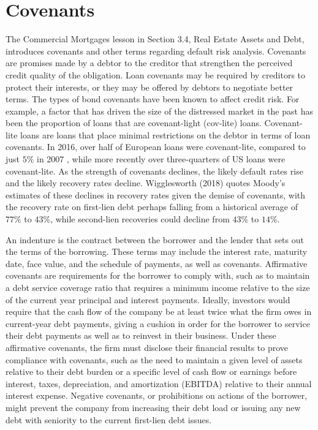\documentclass[11pt]{article}
\begin{document}
\section*{Covenants}
The Commercial Mortgages lesson in Section 3.4, Real Estate Assets and Debt, introduces covenants and other terms regarding default risk analysis. Covenants are promises made by a debtor to the creditor that strengthen the perceived credit quality of the obligation. Loan covenants may be required by creditors to protect their interests, or they may be offered by debtors to negotiate better terms. The types of bond covenants have been known to affect credit risk. For example, a factor that has driven the size of the distressed market in the past has been the proportion of loans that are covenant-light (cov-lite) loans. Covenant-lite loans are loans that place minimal restrictions on the debtor in terms of loan covenants. In 2016, over half of European loans were covenant-lite, compared to just $5 \%$ in 2007 , while more recently over three-quarters of US loans were covenant-lite. As the strength of covenants declines, the likely default rates rise and the likely recovery rates decline. Wigglesworth (2018) quotes Moody's estimates of these declines in recovery rates given the demise of covenants, with the recovery rate on first-lien debt perhaps falling from a historical average of $77 \%$ to $43 \%$, while second-lien recoveries could decline from $43 \%$ to $14 \%$.

An indenture is the contract between the borrower and the lender that sets out the terms of the borrowing. These terms may include the interest rate, maturity date, face value, and the schedule of payments, as well as covenants. Affirmative covenants are requirements for the borrower to comply with, such as to maintain a debt service coverage ratio that requires a minimum income relative to the size of the current year principal and interest payments. Ideally, investors would require that the cash flow of the company be at least twice what the firm owes in current-year debt payments, giving a cushion in order for the borrower to service their debt payments as well as to reinvest in their business. Under these affirmative covenants, the firm must disclose their financial results to prove compliance with covenants, such as the need to maintain a given level of assets relative to their debt burden or a specific level of cash flow or earnings before interest, taxes, depreciation, and amortization (EBITDA) relative to their annual interest expense. Negative covenants, or prohibitions on actions of the borrower, might prevent the company from increasing their debt load or issuing any new debt with seniority to the current first-lien debt issues.
\end{document}
